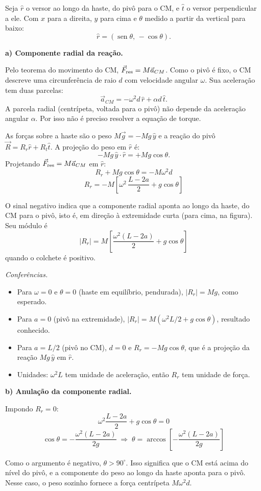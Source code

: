 \documentclass{article}%
\begin{document}
Seja $\hat r$ o versor ao longo da haste, do pivô para o CM, e $\hat t$ o versor perpendicular a ele. Com $x$ para a direita, $y$ para cima e $\theta$ medido a partir da vertical para baixo:
\[
\hat r=(\operatorname{sen}\theta,\,-\cos\theta).
\]

\textbf{a) Componente radial da reação.}

Pelo teorema do movimento do CM, $\vec F_{\rm res}=M\vec a_{CM}$. Como o pivô é fixo, o CM descreve uma circunferência de raio $d$ com velocidade angular $\omega$. Sua aceleração tem duas parcelas:
\[
\vec a_{CM}=-\omega^{2}d\,\hat r+\alpha d\,\hat t.
\]
A parcela radial (centrípeta, voltada para o pivô) não depende da aceleração angular $\alpha$. Por isso não é preciso resolver a equação de torque.

As forças sobre a haste são o peso $M\vec g=-Mg\,\hat y$ e a reação do pivô $\vec R=R_r\hat r+R_t\hat t$. A projeção do peso em $\hat r$ é:
\[
-Mg\,\hat y\cdot\hat r=+Mg\cos\theta .
\]
Projetando $\vec F_{\rm res}=M\vec a_{CM}$ em $\hat r$:
\[
R_r+Mg\cos\theta=-M\omega^{2}d
\]
\[
\boxed{R_r=-M\left[\omega^{2}\,\frac{L-2a}{2}+g\cos\theta\right]}
\]

O sinal negativo indica que a componente radial aponta ao longo da haste, do CM para o pivô, isto é, em direção à extremidade curta (para cima, na figura). Seu módulo é
\[
|R_r|=M\left[\frac{\omega^{2}(L-2a)}{2}+g\cos\theta\right]
\]
quando o colchete é positivo.

\emph{Conferências.}
\begin{itemize}
\item Para $\omega=0$ e $\theta=0$ (haste em equilíbrio, pendurada), $|R_r|=Mg$, como esperado.
\item Para $a=0$ (pivô na extremidade), $|R_r|=M(\omega^2L/2+g\cos\theta)$, resultado conhecido.
\item Para $a=L/2$ (pivô no CM), $d=0$ e $R_r=-Mg\cos\theta$, que é a projeção da reação $Mg\,\hat y$ em $\hat r$.
\item Unidades: $\omega^{2}L$ tem unidade de aceleração, então $R_r$ tem unidade de força.
\end{itemize}

\textbf{b) Anulação da componente radial.}

Impondo $R_r=0$:
\[
\omega^{2}\frac{L-2a}{2}+g\cos\theta=0
\]
\[
\boxed{\cos\theta=-\frac{\omega^{2}(L-2a)}{2g}\;\Rightarrow\;\theta=\arccos\!\left[-\frac{\omega^{2}(L-2a)}{2g}\right]}
\]

Como o argumento é negativo, $\theta>90^\circ$. Isso significa que o CM está acima do nível do pivô, e a componente do peso ao longo da haste aponta para o pivô. Nesse caso, o peso sozinho fornece a força centrípeta $M\omega^{2}d$.
\end{document}
